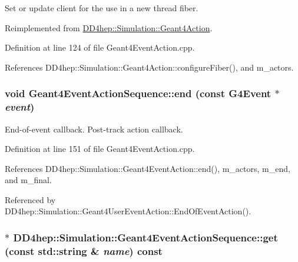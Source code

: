 Set or update client for the use in a new thread fiber. 

Reimplemented from \hyperlink{class_d_d4hep_1_1_simulation_1_1_geant4_action_a6adc7138508303e4e417cb48a737ab19}{DD4hep::Simulation::Geant4Action}.

Definition at line 124 of file Geant4EventAction.cpp.

References DD4hep::Simulation::Geant4Action::configureFiber(), and m\_\-actors.\hypertarget{class_d_d4hep_1_1_simulation_1_1_geant4_event_action_sequence_a5815e04637704ceddb2abd2677e1522b}{
\subsubsection[{end}]{\setlength{\rightskip}{0pt plus 5cm}void Geant4EventActionSequence::end (const G4Event $\ast$ {\em event})}}
\label{class_d_d4hep_1_1_simulation_1_1_geant4_event_action_sequence_a5815e04637704ceddb2abd2677e1522b}


End-\/of-\/event callback. Post-\/track action callback. 

Definition at line 151 of file Geant4EventAction.cpp.

References DD4hep::Simulation::Geant4EventAction::end(), m\_\-actors, m\_\-end, and m\_\-final.

Referenced by DD4hep::Simulation::Geant4UserEventAction::EndOfEventAction().\hypertarget{class_d_d4hep_1_1_simulation_1_1_geant4_event_action_sequence_a3c02fae6b8cad1aa2d663716fd19af53}{
\subsubsection[{get}]{$\ast$ DD4hep::Simulation::Geant4EventActionSequence::get (const std::string \& {\em name}) const}}
\label{class_d_d4hep_1_1_simulation_1_1_geant4_event_action_sequence_a3c02fae6b8cad1aa2d663716fd19af53}



